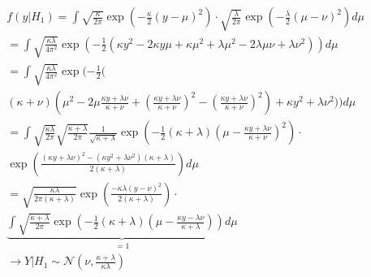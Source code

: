 \documentclass{article}\usepackage[]{graphicx}\usepackage[]{xcolor}
\begin{document}
\begin{multicols*}{2}
\begin{align*}
&f(y|H_1)=\int\sqrt{\frac{\kappa}{2\pi}}\exp\left(-\frac{\kappa}{2}(y-\mu)^2\right)\cdot\sqrt{\frac{\lambda}{2\pi}}\exp\left(-\frac{\lambda}{2}(\mu-\nu)^2\right)d\mu\\
&=\int\sqrt{\frac{\kappa\lambda}{4\pi^2}}\exp\left(-\frac{1}{2}\left(\kappa y^2-2\kappa y\mu+\kappa\mu^2+\lambda\mu^2 -2\lambda\mu\nu+\lambda\nu^2\right)\right)d\mu\\
&=\int\sqrt{\frac{\kappa\lambda}{4\pi^2}}\exp(-\frac{1}{2}(\\
&(\kappa+\nu)(\mu^2-2\mu\frac{\kappa y+\lambda\nu}{\kappa+\nu}+\left(\frac{\kappa y+\lambda\nu}{\kappa+\nu}\right)^2- \left(\frac{\kappa y+\lambda\nu}{\kappa+\nu}\right)^2)+ \kappa y^2+\lambda\nu^2 ))d\mu\\
&=\int\sqrt{\frac{\kappa\lambda}{2\pi}}\sqrt{\frac{\kappa+\lambda}{2\pi}}\frac{1}{\sqrt{\kappa+\lambda}}\exp\left(-\frac{1}{2}(\kappa+\lambda)\left(\mu-\frac{\kappa y +\lambda\nu}{\kappa+\nu}\right)^2\right)\cdot\\
&\exp\left(\frac{(\kappa y+\lambda\nu)^2-(\kappa y^2+\lambda\nu^2)(\kappa+\lambda)}{2(\kappa+\lambda)}\right)d\mu\\
&=\sqrt{\frac{\kappa\lambda}{2\pi(\kappa+\lambda)}}\exp\left(\frac{-\kappa\lambda(y-\nu)^2}{2(\kappa+\lambda)}\right)\cdot\\
&\underbrace{\int\sqrt{\frac{\kappa+\lambda}{2\pi}}\exp\left(-\frac{1}{2}(\kappa+\lambda)\left(\mu-\frac{\kappa y-\lambda\nu}{\kappa+\lambda}\right)\right)d\mu}_{=1}\\
&\rightarrow \boxed{Y|H_1\sim\mathcal{N}\left(\nu, \frac{\kappa+\lambda}{\kappa\lambda}\right)}
\end{align*}



\end{multicols*}
\end{document}
